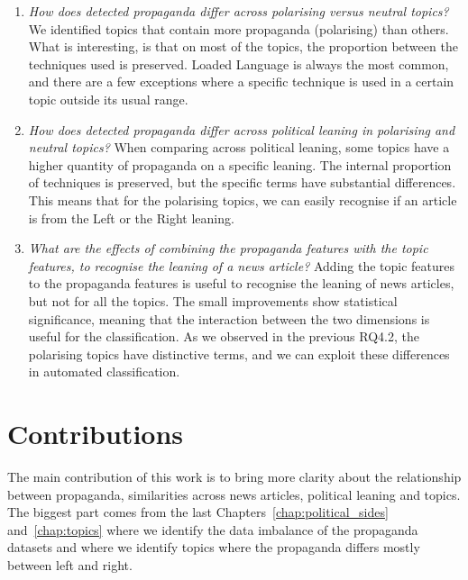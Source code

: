 \begin{enumerate}[label={\textbf{RQ4.\arabic*:}},leftmargin=2cm]
    \item \emph{How does detected propaganda differ across polarising versus neutral topics?} We identified topics that contain more propaganda (polarising) than others. What is interesting, is that on most of the topics, the proportion between the techniques used is preserved. %
          Loaded Language is always the most common, and there are a few exceptions where a specific technique is used in a certain topic outside its usual range.
    \item \emph{How does detected propaganda differ across political leaning in polarising and neutral topics?} When comparing across political leaning, some topics have a higher quantity of propaganda on a specific leaning. The internal proportion of techniques is preserved, but the specific terms have substantial differences. This means that for the polarising topics, we can easily recognise if an article is from the Left or the Right leaning. %
    \item \textit{What are the effects of combining the propaganda features with the topic features, to recognise the leaning of a news article?} Adding the topic features to the propaganda features is useful to recognise the leaning of news articles, but not for all the topics. The small improvements show statistical significance, meaning that the interaction between the two dimensions is useful for the classification. As we observed in the previous RQ4.2, the polarising topics have distinctive terms, and we can exploit these differences in automated classification.
\end{enumerate}




\section{\statusgreen Contributions}
\label{sec:discussion_contributions}

The main contribution of this work is to bring more clarity about the relationship between propaganda, similarities across news articles, political leaning and topics.
The biggest part comes from the last Chapters~\ref{chap:political_sides} and~\ref{chap:topics} where we identify the data imbalance of the propaganda datasets and where we identify topics where the propaganda differs mostly between left and right.

